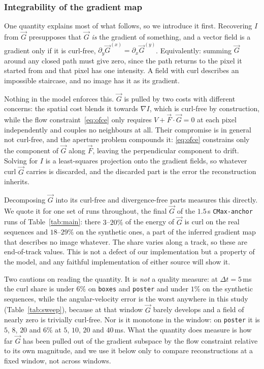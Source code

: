 \documentclass[journal]{IEEEtran}
\newcommand{\Imap}{I}
\newcommand{\Vmap}{V}
\newcommand{\Gmap}{\vec{G}}
\newcommand{\Fmap}{\vec{F}}
\begin{document}
\subsubsection{Integrability of the gradient map}
\label{sec:curl}
One quantity explains most of what follows, so we introduce it first. Recovering
$\Imap$ from $\Gmap$ presupposes that $\Gmap$ \emph{is} the gradient of
something, and a vector field is a gradient only if it is curl-free,
$\partial_y\Gmap^{(x)} = \partial_x\Gmap^{(y)}$. Equivalently: summing $\Gmap$
around any closed path must give zero, since the path returns to the pixel it
started from and that pixel has one intensity. A field with curl describes an
impossible staircase, and no image has it as its gradient.

Nothing in the model enforces this. $\Gmap$ is pulled by two costs with
different concerns: the spatial cost blends it towards $\nabla\Imap$, which is
curl-free by construction, while the flow constraint~\eqref{eq:ofce} only
requires $\Vmap+\Fmap\!\cdot\!\Gmap=0$ at each pixel independently and couples
no neighbours at all. Their compromise is in general not curl-free, and the
aperture problem compounds it: \eqref{eq:ofce} constrains only the component of
$\Gmap$ along $\Fmap$, leaving the perpendicular component to drift. Solving
for $\Imap$ is a least-squares projection onto the gradient fields, so whatever
curl $\Gmap$ carries is discarded, and the discarded part is the error the
reconstruction inherits.

Decomposing $\Gmap$ into its curl-free and divergence-free parts measures this
directly. We quote it for one set of runs throughout, the final $\Gmap$ of the
$1.5$\,s \texttt{CMax-anchor} runs of Table~\ref{tab:main}: there
$3$--$20\%$ of the energy of $\Gmap$ is curl on the real sequences and
$18$--$29\%$ on the synthetic ones, a part of the inferred gradient map that
describes no image whatever. The share varies along a track, so these are
end-of-track values. This is not a defect of our implementation but a property of the
model, and any faithful implementation of either source will show it.

Two cautions on reading the quantity. It is \emph{not} a quality measure: at
$\Delta t=5$\,ms the curl share is under $6\%$ on \texttt{boxes} and
\texttt{poster} and under $1\%$ on the synthetic sequences, while the
angular-velocity error is the worst anywhere in this study
(Table~\ref{tab:sweep}), because at that window $\Gmap$ barely develops and a
field of nearly zero is trivially curl-free. Nor is it monotone in the window:
on \texttt{poster} it is $5$, $8$, $20$ and $6\%$ at $5$, $10$, $20$ and
$40$\,ms. What the quantity does measure is how far $\Gmap$ has been pulled
out of the gradient subspace by the flow constraint relative to its own
magnitude, and we use it below only to compare reconstructions at a fixed
window, not across windows.
\end{document}
